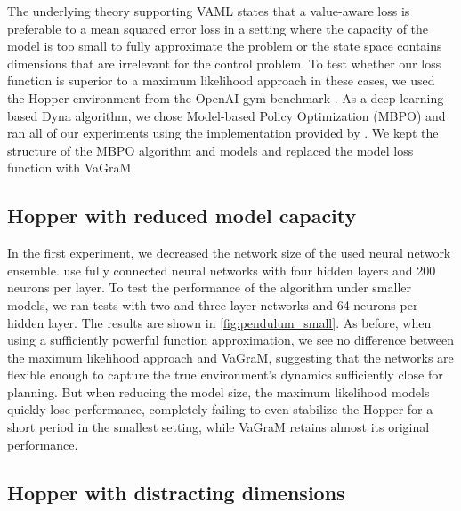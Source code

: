 The underlying theory supporting VAML states that a value-aware loss is preferable to a mean squared error loss in a setting where the capacity of the model is too small to fully approximate the problem or the state space contains dimensions that are irrelevant for the control problem.
To test whether our loss function is superior to a maximum likelihood approach in these cases, we used the Hopper environment from the OpenAI gym benchmark \parencite{brockman2016openai}. 
As a deep learning based Dyna algorithm, we chose Model-based Policy Optimization (MBPO) \parencite{mbpo} and ran all of our experiments using the implementation provided by \cite{Pineda2021MBRL}.
We kept the structure of the MBPO algorithm and models and replaced the model loss function with VaGraM.

\subsection{Hopper with reduced model capacity}
In the first experiment, we decreased the network size of the used neural network ensemble.
\cite{mbpo} use fully connected neural networks with four hidden layers and 200 neurons per layer.
To test the performance of the algorithm under smaller models, we ran tests with two and three layer networks and 64 neurons per hidden layer.
The results are shown in \autoref{fig:pendulum_small}.
As before, when using a sufficiently powerful function approximation, we see no difference between the maximum likelihood approach and VaGraM, suggesting that the networks are flexible enough to capture the true environment's dynamics sufficiently close for planning.
But when reducing the model size, the maximum likelihood models quickly lose performance, completely failing to even stabilize the Hopper for a short period in the smallest setting, while VaGraM retains almost its original performance.

\subsection{Hopper with distracting dimensions}


